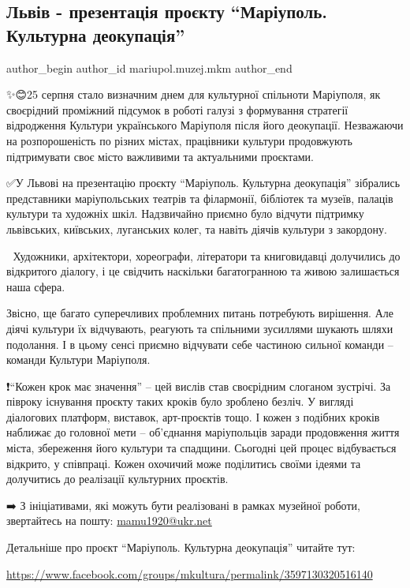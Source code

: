  
 
 
 
 

\subsection{Львів - презентація проєкту \enquote{Маріуполь. Культурна деокупація}}
\label{sec:30_08_2023.fb.mariupol.muzej.mkm.1.lviv_prezentacia_proektu_kulturna_deokupacia}

\ifcmt
 author_begin
   author_id mariupol.muzej.mkm
 author_end
\fi

✨️😊25 серпня стало визначним днем для культурної спільноти Маріуполя, як
своєрідний проміжний підсумок в роботі галузі з формування стратегії
відродження Культури українського Маріуполя після його деокупації. Незважаючи
на розпорошеність по різних містах, працівники культури продовжують
підтримувати своє місто важливими та актуальними проєктами.

✅️У Львові на презентацію проєкту \enquote{Маріуполь. Культурна деокупація} зібрались
представники маріупольських театрів та філармонії, бібліотек та музеїв, палаців
культури та художніх шкіл. Надзвичайно приємно було відчути підтримку
львівських, київських, луганських колег, та навіть діячів культури з закордону.

🔅 Художники, архітектори, хореографи, літератори та книговидавці долучились до
відкритого діалогу, і це свідчить наскільки багатогранною та живою залишається
наша сфера.

Звісно, ще багато суперечливих проблемних питань потребують вирішення. Але
діячі культури їх відчувають, реагують та спільними зусиллями шукають шляхи
подолання. І в цьому сенсі приємно відчувати себе частиною сильної команди –
команди Культури Маріуполя.

❗️\enquote{Кожен крок має значення} – цей вислів став своєрідним слоганом зустрічі. За
півроку існування проєкту таких кроків було зроблено безліч. У вигляді
діалогових платформ, виставок, арт-проєктів тощо. І кожен з подібних кроків
наближає до головної мети – об'єднання маріупольців заради продовження життя
міста, збереження його культури та спадщини. Сьогодні цей процес відбувається
відкрито, у співпраці. Кожен охочичий може поділитись своїми ідеями та
долучитись до реалізації культурних проєктів.

➡️ З ініціативами, які можуть бути реалізовані в рамках музейної роботи, звертайтесь на пошту: \url{mamu1920@ukr.net}

Детальніше про проєкт \enquote{Маріуполь. Культурна деокупація} читайте тут:

\url{https://www.facebook.com/groups/mkultura/permalink/3597130320516140}
